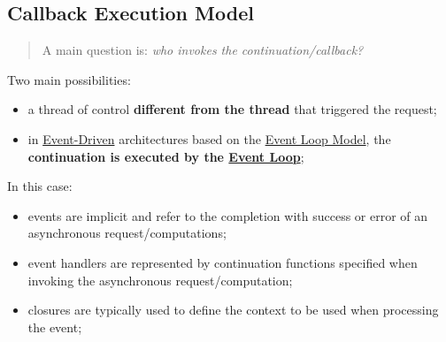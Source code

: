 \subsection{Callback Execution Model}\label{sub:rs_callback_execution_model} %
\begin{quote}
    A main question is: \textit{who invokes the continuation/callback?}
\end{quote}
Two main possibilities:
\begin{itemize}
    \item a thread of control \textbf{different from the thread} that triggered the request;
        \begin{warning}
        \end{warning}
    \item in \hyperref[sec:rs_event_driven_programming]{Event-Driven} architectures based on the  \hyperref[sec:rs_event_loop]{Event Loop Model}, the \textbf{continuation is executed by the  \hyperref[sec:rs_event_loop]{Event Loop}};
\end{itemize}
\begin{note}
    In this case:
    \begin{itemize}
        \item events are implicit and refer to the completion with success or error of an asynchronous request/computations;
        \item event handlers are represented by continuation functions specified when invoking the asynchronous request/computation;
        \item closures are typically used to define the context to be used when processing the event;
    \end{itemize}
\end{note}

